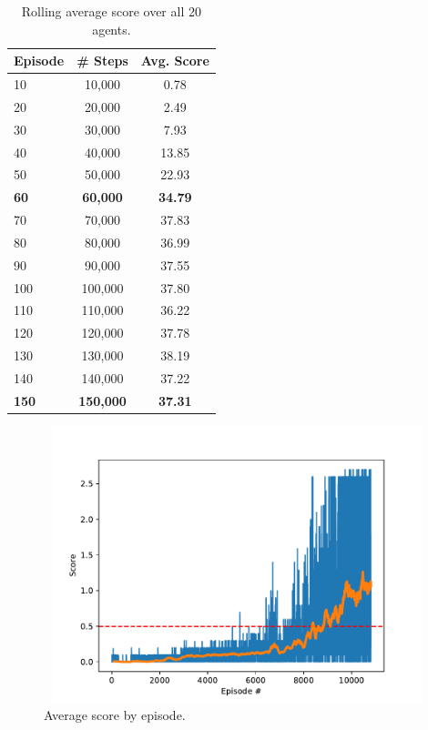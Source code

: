 \documentclass[pagenumber=off]{article}
\begin{document}
\begin{table}[h]
  \centering
    \begin{tabular}{|l|c|c|}
      \hline
      {\bf Episode} & {\bf \# Steps} & {\bf Avg. Score} \\ 
      \hline
      10 & 10,000 & 0.78 \\
      20 & 20,000 & 2.49 \\
      30 & 30,000 & 7.93 \\
      40 & 40,000 & 13.85 \\
      50 & 50,000 & 22.93 \\
      {\bf  60} & {\bf 60,000} & {\bf 34.79} \\
      70 & 70,000 & 37.83 \\
      80 & 80,000 & 36.99 \\
      90 & 90,000 & 37.55 \\
      100 & 100,000 & 37.80 \\
      110 & 110,000 & 36.22 \\
      120 & 120,000 & 37.78 \\
      130 & 130,000 & 38.19 \\
      140 & 140,000 & 37.22 \\
      \hline
      {\bf 150} & {\bf 150,000} & {\bf 37.31} \\      
      \hline
    \end{tabular}
    \caption{Rolling average score over all 20 agents.}
  \end{table}

\vspace{-1cm}
\begin{figure}[!h]
  \centerline{\includegraphics[page=1, height=8cm, width=14cm, angle=0]{./Plots/Average_Score.pdf}}
  \caption{Average score by episode.}
\end{figure}
\end{document}
